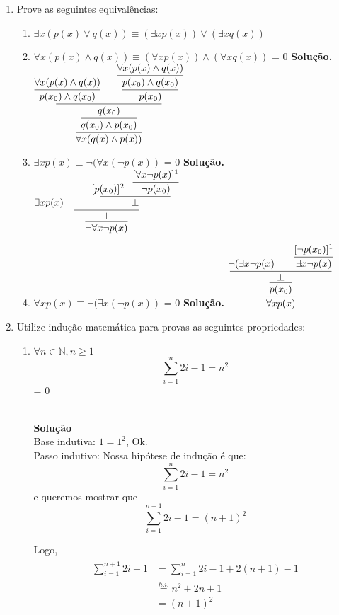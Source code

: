 \documentclass[a4paper]{article}
\newcommand{\answer}[2]{\ifnum#1= 0  {\color{blue} #2}\else \fi}
\begin{document}
\begin{enumerate}
\item Prove as seguintes equivalências:
\begin{enumerate}
\item $\exists x (p(x) \lor q(x)) \equiv (\exists x p(x)) \lor
  (\exists x q(x))$
\item $\forall x (p(x) \land q(x)) \equiv (\forall x p(x)) \land
  (\forall x q(x))$ \newline
  	\answer{0}{
    {\bf Solução.} \newline
    $\infer{\forall x ( q(x) \land p(x))}{\infer{q(x_{0}) \land p (x_{0})}{\infer{q(x_{0})}{\infer{p(x_{0}) \land q(x_{0})}{\forall x ( p(x) \land q(x))} \hspace{6mm} \infer{p(x_{0})}{\infer{p(x_{0}) \land q (x_{0})}{\forall x (p(x)\land q(x))}}}}}$
    }
\item $\exists x p(x) \equiv \neg (\forall x (\neg p(x))$ \newline
	\answer{0}{
    {\bf Solução.} \newline
    $\infer{\neg{} \forall x \neg p(x)}{\infer{\bot}{\exists x p(x) \hspace{10mm} \infer{\bot}{[p(x_{0})]^2 \hspace{3mm} \infer{\neg{} p(x_{0})}{[\forall x \neg{} p(x)]^1}}}}$
   	}
\item $\forall x p(x) \equiv \neg (\exists x (\neg p(x))$ \newline
	\answer{0}{
    {\bf Solução.} \newline
    $\infer{\forall x p(x)}{\infer{p(x_{0})}{\infer{\bot}{\neg{}(\exists x \neg{} p(x) \hspace{7mm} \infer{\exists x \neg{} p (x)}{[\neg p(x_{0})]^1}}}}$
    }
\end{enumerate}

\item Utilize indução matemática para provas as seguintes propriedades:
\begin{enumerate}
\item $\forall n \in \mathbb{N}, n \geq 1$ 
  $$\displaystyle\sum_{i=1}^{n}2i-1 = n^2$$
  \answer{0}{\\ 
    {\bf Solução} \\
    
    Base indutiva: $1 = 1^2$, Ok.\\
    Passo indutivo: Nossa hipótese de indução é que:
    $$\displaystyle\sum_{i=1}^{n}2i-1 = n^2$$
    e queremos mostrar que
    $$\displaystyle\sum_{i=1}^{n+1}2i-1 = (n+1)^2$$
    
    Logo,
    \begin{align*}
      \begin{split}
        \sum_{i=1}^{n+1}2i-1 &=\sum_{i=1}^n2i-1  + 2(n+1)-1\\
        &\stackrel{h.i.}{=} n^2 + 2n + 1\\
        &= (n+1)^2
      \end{split}
    \end{align*} 
  }


\end{enumerate}
\end{enumerate}
\end{document}
